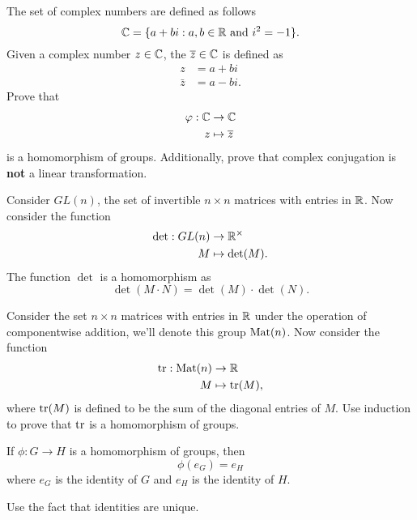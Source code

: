 \documentclass{ximera}
\begin{document}
\begin{exercise}
  The set of complex numbers are defined as follows
  \[
  \mathbb C = \{ a + b i: \text{$a,b\in\mathbb R$ and $i^2 = -1$}\}.
  \]
  Given a complex number $z\in\mathbb C$, the 
  $\overline{z}\in\mathbb C$ is defined as
  \begin{align*}
    z &= a+bi\\
    \bar{z} &= a- bi.
  \end{align*}
  Prove that
  \begin{align*}
    \varphi:\mathbb C &\to\mathbb C\\
    z &\mapsto \overline{z}
  \end{align*}
  is a homomorphism of groups.  Additionally, prove that complex
  conjugation is \textbf{not} a linear transformation.
\end{exercise}




\begin{example}[Determinants]\label{EG:det}
  Consider $GL(n)$, the set of invertible $n\times n$ matrices with
  entries in $\mathbb R$. Now consider the function
  \begin{align*}
    \det: GL(n) &\to \mathbb R^\times \\
             M  &\mapsto  \det(M).
  \end{align*}
  The function $\det$ is a homomorphism as
  \[
  \det(M \cdot N) = \det(M) \cdot \det(N).
  \]
\end{example}


\begin{exercise}
  Consider the set $n\times n$ matrices with entries in $\mathbb R$ under the
  operation of componentwise addition, we'll denote this group $\operatorname{Mat}(n)$. Now consider the function
  \begin{align*}
    \operatorname{tr}:\operatorname{Mat}(n) &\to \mathbb R\\
    M &\mapsto \operatorname{tr}(M),
  \end{align*}
  where $\operatorname{tr}(M)$ is defined to be the sum of the diagonal entries of
  $M$. Use induction to prove that $\operatorname{tr}$ is a homomorphism of groups.
\end{exercise}


\begin{lemma}\label{L:HPId}
  If $\phi:G\to H$ is a homomorphism of groups, then
  \[
  \phi(e_G) = e_H
  \]
  where $e_G$ is the identity of $G$ and $e_H$ is the identity of
  $H$.
  \begin{sketch}
    Use the fact that identities are unique.
  \end{sketch}
\end{lemma}
\end{document}
